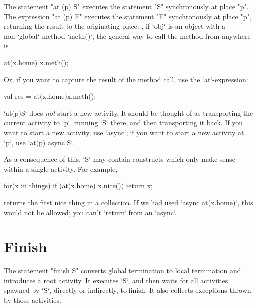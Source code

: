 The statement \xcd"at (p) S" executes the statement \xcd"S"
synchronously at place \xcd"p".
The expression \xcd"at (p) E" executes the statement \xcd"E"
synchronously at place \xcd"p", returning the result to the
originating place.  \Eg, if \xcd`obj` is an object with a non-\xcd`global`
method \xcd`meth()`, the general way to call the method from anywhere is 
\begin{xten}
at(x.home) x.meth();
\end{xten}
\noindent 
Or, if you want to capture the result of the method call, use the
\xcd`at`-expression:  
\begin{xten}
val res = at(x.home)x.meth();
\end{xten}



\xcd`at(p)S` does {\em not} start a new activity.  It should be thought of as
transporting the current activity to \xcd`p`, running \xcd`S` there, and then
transporting it back.    If you want to start a new activity, use \xcd`async`;
if you want to start a new activity at \xcd`p`, use 
\xcd`at(p) async S`.  




As a consequence of this, \xcd`S` may contain constructs which only make sense
within a single activity.  For example, 


\begin{xten}
  for(x in things) 
    if (at(x.home) x.nice()) 
        return x;
\end{xten}
returns the first nice thing in a collection.   If we had used 
\xcd`async at(x.home)`, this would not be allowed; 
you can't \xcd`return` from an
\xcd`async`. 

\section{Finish}\label{finish}
The statement \xcd"finish S" converts global termination to local
termination and introduces a root activity.   It executes \xcd`S`, and then
waits for all activities spawned by \xcd`S`, directly or indirectly, to
finish. It also collects exceptions thrown by those activities.

